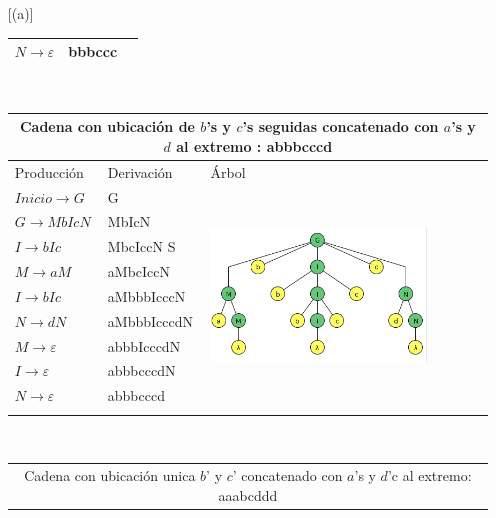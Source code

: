 \documentclass{article}
\begin{document}
\begin{enumerate} [(a)]
\begin{tabular}{|p{5cm}|p{5cm}|p{5cm}|  }
             $ N \to \varepsilon$ & bbbccc &\\
             \hline
            \end{tabular}
            \\
            \begin{tabular}{|p{5cm}|p{5cm}|p{5cm}|  }
            \hline
            \multicolumn{3}{|c|}{Cadena con ubicación de $b$'s  y $c$'s seguidas concatenado con $a$'s y $d$ al extremo : abbbcccd} \\
            \hline
            Producción & Derivación & Árbol\\
            \hline
            $ Inicio \to G$ & G & \multirow{9}{*}{
            \begin{minipage}{.3\textwidth}
            \includegraphics[width=0.8\textwidth]{img/eje_d_caso2.png}
            \end{minipage}
            } \\
             $ G \to MbIcN$ & MbIcN & \\
             $ I \to bIc$ & MbcIccN S & \\
             $ M \to aM$ & aMbcIccN&\\
             $ I \to bIc$ & aMbbbIcccN&\\
             $ N \to dN$ & aMbbbIcccdN&\\
             $ M \to \varepsilon$ & abbbIcccdN&\\
             $ I \to \varepsilon$ & abbbcccdN&\\
             $ N \to \varepsilon$ & abbbcccd&\\
             &&\\
             \hline
            \end{tabular}
            \\
            \begin{tabular}{|p{5cm}|p{5cm}|p{5cm}|  }
            \hline
            \multicolumn{3}{|c|}{Cadena con ubicación unica $b$'  y $c$' concatenado con $a$'s y $d$'c al extremo: aaabcddd} \\

\end{tabular}
\end{enumerate}
\end{document}
